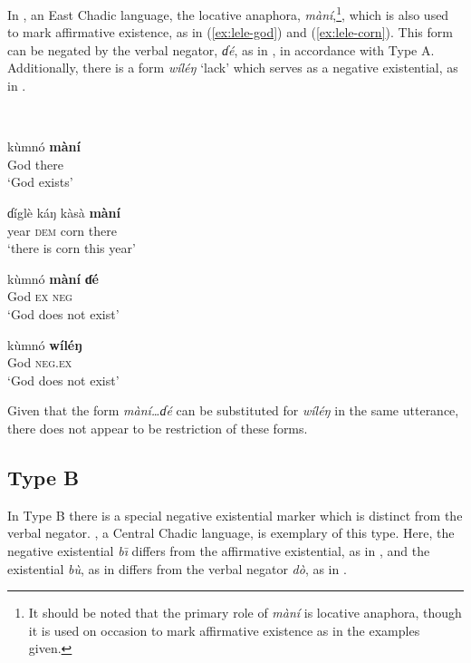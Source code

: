 \documentclass[output=paper,draft,draftmode,colorlinks,citecolor=brown]{langscibook}
\begin{document}
In , an East Chadic language, the locative anaphora,
\textit{màní},\footnote{It should be noted that the primary role of
\textit{màní} is locative anaphora, though it is used on occasion to
mark affirmative existence as in the examples given.}, which is also used to mark
affirmative existence, as in (\ref{ex:lele-god}) and (\ref{ex:lele-corn}). This
form can be negated by the verbal negator, \textit{ɗé}, as in
, in accordance with Type A. Additionally, there is a
form \textit{wíléŋ} `lack' which serves as a negative existential,
as in .  

\ea\label{ex:lele-god-corn-no-god}
\\ 

\ea\label{ex:lele-god}

\gll kùmnó \textbf{màní}\\
God there\\

\glt `God exists'
\ex\label{ex:lele-corn} 

\gll ɗíglè káŋ kàsà
\textbf{màní}\\ year \textsc{dem} corn there\\

\glt `there is corn this year'
\ex\label{ex:lele-no-god} 

\gll kùmnó \textbf{màní} \textbf{ɗé}\\
God \textsc{ex} \textsc{neg}\\ 

\glt `God does not exist'
\ex\label{ex:lele-still-no-god} 

\gll kùmnó \textbf{wíléŋ}\\
God \textsc{neg.ex}\\ 

\glt `God does not exist'
\z
\z

Given that the form \textit{màní…ɗé} can be substituted for \textit{wíléŋ} in the same utterance, there does not appear to be restriction of these forms.

\subsection{Type B}\label{sec:3:3.3}

In Type B there is a special negative existential marker which is distinct
from the verbal negator. , a Central Chadic language, is
exemplary of this type. Here, the negative existential \textit{b\=\i}
differs from the affirmative existential, as in , and
the existential \textit{bù}, as in  differs from the verbal
negator \textit{d\`o}, as in .  
\end{document}
